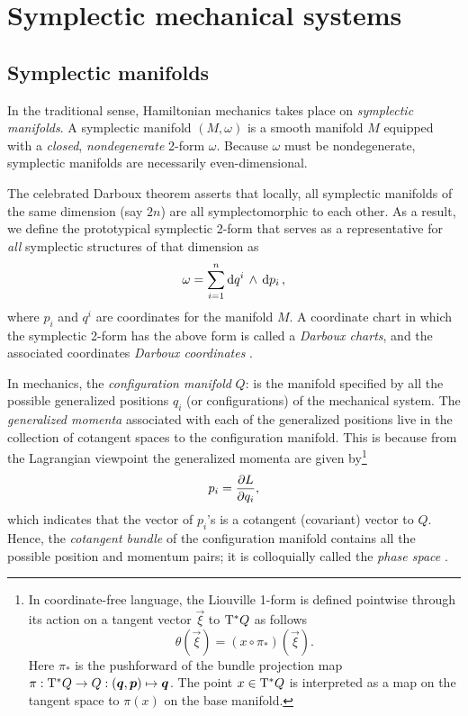 \section{Symplectic mechanical systems}
\label{sec:symplectic}

\subsection{Symplectic manifolds}
In the traditional sense, Hamiltonian mechanics takes place on \emph{symplectic manifolds}. A symplectic manifold $(M, \omega)$ is a smooth manifold $M$ equipped with a \emph{closed}, \emph{nondegenerate} 2-form $\omega$. Because $\omega$ must be nondegenerate, symplectic manifolds are necessarily even-dimensional. 

The celebrated Darboux theorem asserts that locally, all symplectic manifolds of the same dimension (say $2n$) are all symplectomorphic to each other. As a result, we define the prototypical symplectic 2-form that serves as a representative for \emph{all} symplectic structures of that dimension as
\begin{equation}
    \omega = \sum_{i = 1}^n  \dd{q^i}\,\wedge\,\dd{p_i} ,
    \label{eq:darboux_symplectic_form}
\end{equation}
where $p_i$ and $q^i$ are coordinates for the manifold $M$. A coordinate chart in which the symplectic 2-form has the above form is called a \emph{Darboux charts}, and the associated coordinates \emph{Darboux coordinates} \cite{Cannas2001, Arnold1989}.

In mechanics, the \emph{configuration manifold} $Q$: is the manifold specified by all the possible generalized positions $q_i$ (or configurations) of the mechanical system. The \emph{generalized momenta} associated with each of the generalized positions live in the collection of cotangent spaces to the configuration manifold. This is because from the Lagrangian viewpoint the generalized momenta are given by\footnote
{
    In coordinate-free language, the Liouville 1-form is defined pointwise through its action on a tangent vector $\vec{\xi}$ to $\mathrm{T}^*Q$ as follows
    $$ \theta(\vec{\xi}) = (x \circ \pi_*) (\vec{\xi}). $$
    Here $\pi_*$ is the pushforward of the bundle projection map $\pi: \ctbundle{Q} \to Q: (\vec{q}, \vec{p}) \mapsto \vec{q}$. The point $x \in \mathrm{T}^*Q$ is interpreted as a map on the tangent space to $\pi(x)$ on the base manifold.
}
$$ p_i = \pdv{L}{q_i}, $$
which indicates that the vector of $p_i$'s is a cotangent (covariant) vector to $Q$. Hence, the \emph{cotangent bundle} of the configuration manifold contains all the possible position and momentum pairs; it is colloquially called the \emph{phase space} \cite{Abraham1978,Arnold1989,Libermann1987}.

